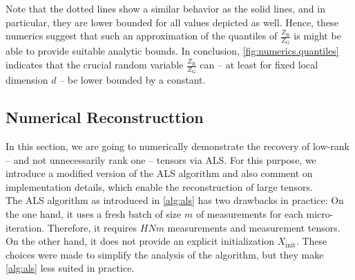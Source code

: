Note that the dotted lines show a similar behavior as the solid lines, and in particular, they are lower bounded for all values depicted as well.
Hence, these numerics suggest that such an approximation of the quantiles of $\frac{Z_\mathrm{B}}{Z_\mathrm{G}}$ is might be able to provide suitable analytic bounds.
In conclusion, \cref{fig:numerics.quantiles} indicates that the crucial random variable $\frac{Z_\mathrm{B}}{Z_\mathrm{G}}$ can -- at least for fixed local dimension $d$ -- be lower bounded by a constant.



\subsection{Numerical Reconstructtion}%
\label{sub:als.numerics}

In this section, we are going to numerically demonstrate the recovery of low-rank -- and not unnecessarily rank one -- tensors via ALS.
For this purpose, we introduce a modified version of the ALS algorithm and also comment on implementation details, which enable the reconstruction of large tensors.\\

The ALS algorithm as introduced in \cref{alg:als} has two drawbacks in practice:
On the one hand, it uses a fresh batch of size $m$ of measurements for each micro-iteration.
Therefore, it requires $HNm$ measurements and measurement tensors.
On the other hand, it does not provide an explicit initialization $X_\mathrm{init}$.
These choices were made to simplify the analysis of the algorithm, but they make \cref{alg:als} less suited in practice.

